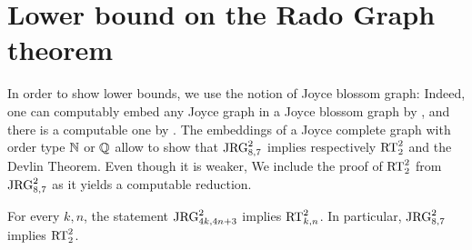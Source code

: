\section{Lower bound on the Rado Graph theorem}
In order to show lower bounds, we  use the notion of Joyce blossom graph: Indeed, one can computably embed any Joyce graph in a Joyce blossom graph by , and there is a computable one by .  %
The embeddings of a Joyce complete graph with order type $\mathbb{N}$ or $\mathbb{Q}$ allow to show that $\mathrm{JRG}^2_{8,7}$ implies respectively $\mathrm{RT}^{2}_{2}$ and the Devlin Theorem. Even though it is weaker, We include the proof of $\mathrm{RT}^{2}_{2}$ from $\mathrm{JRG}^2_{8,7}$ as it yields a computable reduction.
\begin{theorem}
  For every $k,n$, the statement $\mathrm{JRG}^2_{4k, 4n+3}$ implies $\mathrm{RT}^{2}_{k,n}$. In particular, $\mathrm{JRG}^2_{8, 7}$ implies $\mathrm{RT}^{2}_{2}$.
\end{theorem}
